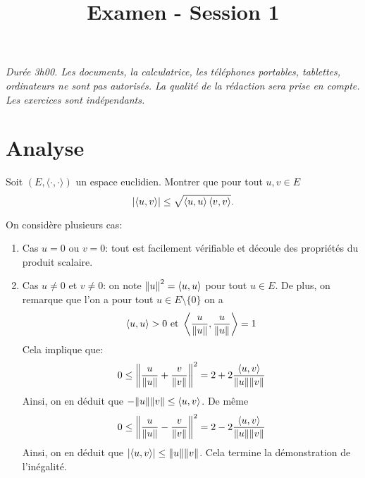 \documentclass{tp_um}
\title{\Large \sffamily\bfseries Examen - Session 1}
\begin{document}
\maketitle

\bigskip

\textit{Durée 3h00. Les documents, la calculatrice, les téléphones portables, tablettes, ordinateurs ne sont pas autorisés. La qualité de la rédaction sera prise en compte. Les exercices sont indépendants.} 

\bigskip
\bigskip

\section{Analyse}

\exo{} Soit $(E,\langle\cdot,\cdot\rangle)$ un espace euclidien. Montrer que pour tout $u,v\in E$ 
\[
	\left\lvert\left\langle u,v\right\rangle\right\rvert \leq \sqrt{\left\langle u,u\right\rangle \left\langle v,v\right\rangle}.
\]

\bigskip 
On considère plusieurs cas:
\begin{enumerate}
		\item 	Cas $u=0$ ou $v=0$: tout est facilement vérifiable et découle des propriétés du produit scalaire.
	\item 	Cas $u \neq 0$ et $v\neq 0$: on note $\left\lVert u\right\rVert^2 = \left\langle u,u\right\rangle$ pour tout $u\in E$. De plus, on remarque que l'on a pour tout $u\in E \setminus \{0\}$ on a 
			\[
				\left\langle u,u\right\rangle >0 \text{ et }\left\langle  \frac{u}{{\left\lVert u\right\rVert}},\frac{u}{{\left\lVert u\right\rVert}} \right\rangle = 1
			\]
			Cela implique que:
			\begin{equation*}\label{eq.cs1}
				0 \leq \left\lVert \frac{u}{{\left\lVert u\right\rVert}} + \frac{v}{{\left\lVert v\right\rVert}} \right\rVert^2  = 2 + 2 \frac{\left\langle u,v\right\rangle}{{\left\lVert u\right\rVert}{\left\lVert v\right\rVert} }
			\end{equation*}
			Ainsi, on en déduit que  $-{\left\lVert u\right\rVert} {\left\lVert v\right\rVert} \leq \left\langle u,v\right\rangle $. De même
			\begin{equation*}
				0 \leq \left\lVert \frac{u}{{\left\lVert u\right\rVert}} - \frac{v}{{\left\lVert v\right\rVert}} \right\rVert^2  = 2 - 2 \frac{\left\langle u,v\right\rangle}{{\left\lVert u\right\rVert}{\left\lVert v\right\rVert} }
			\end{equation*}
			Ainsi, on en déduit que $\left\lvert\left\langle u,v\right\rangle\right\rvert \leq {\left\lVert u\right\rVert} {\left\lVert v\right\rVert} $. %
			Cela termine la démonstration de l'inégalité. 


	\end{enumerate}
\end{document}
